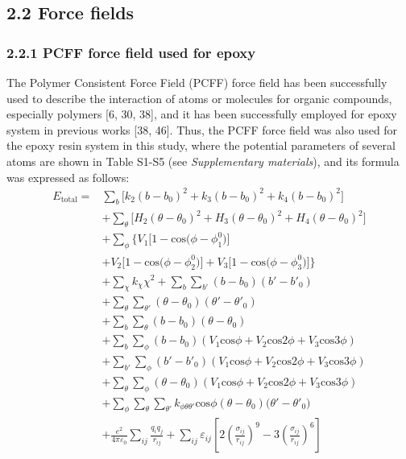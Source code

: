 \documentclass{article}
\begin{document}
\subsection*{2.2 Force fields}

\subsubsection*{2.2.1 PCFF force field used for epoxy}

The Polymer Consistent Force Field (PCFF) force field has been successfully used to describe the interaction of atoms or molecules for organic compounds, especially polymers [6, 30, 38], and it has been successfully employed for epoxy system in previous works [38, 46]. Thus, the PCFF force field was also used for the epoxy resin system in this study, where the potential parameters of several atoms are shown in Table S1-S5 (see \emph{Supplementary materials}), and its formula was expressed as follows:
\begin{equation*}
\begin{aligned}
E_{\mathrm{total}} ={}& \sum_b\Big[k_2(b-b_0)^2+k_3(b-b_0)^2+k_4(b-b_0)^2\Big]\\
&+\sum_\theta\Big[H_2(\theta-\theta_0)^2+H_3(\theta-\theta_0)^2+H_4(\theta-\theta_0)^2\Big]\\
&+\sum_\phi\big\{V_1\big[1-\mathrm{cos}\big(\phi-\phi_1^0\big)\big]\\
&+V_2\big[1-\mathrm{cos}\big(\phi-\phi_2^0\big)\big]+V_3\big[1-\mathrm{cos}\big(\phi-\phi_3^0\big)\big]\big\}\\
&+\sum_\chi k_\chi\chi^2+\sum_b\sum_{b'}(b-b_0)(b'-b'_0)\\
&+\sum_\theta\sum_{\theta'}(\theta-\theta_0)(\theta'-\theta'_0)\\
&+\sum_b\sum_\theta(b-b_0)(\theta-\theta_0)\\
&+\sum_b\sum_\phi(b-b_0)(V_1\mathrm{cos}\phi+V_2\mathrm{cos}2\phi+V_3\mathrm{cos}3\phi)\\
&+\sum_{b'}\sum_\phi(b'-b'_0)(V_1\mathrm{cos}\phi+V_2\mathrm{cos}2\phi+V_3\mathrm{cos}3\phi)\\
&+\sum_\theta\sum_\phi(\theta-\theta_0)(V_1\mathrm{cos}\phi+V_2\mathrm{cos}2\phi+V_3\mathrm{cos}3\phi)\\
&+\sum_\phi\sum_\theta\sum_{\theta'}k_{\phi\theta\theta'}\mathrm{cos}\phi(\theta-\theta_0)\big(\theta'-\theta'_0\big)\\
&+\frac{e^2}{4\pi\varepsilon_0}\sum_{ij}\frac{q_iq_j}{r_{ij}}+\sum_{ij}\varepsilon_{ij}\left[2\left(\frac{\sigma_{ij}}{r_{ij}}\right)^9-3\left(\frac{\sigma_{ij}}{r_{ij}}\right)^6\right]
\end{aligned}\tag{1}
\end{equation*}
\end{document}
